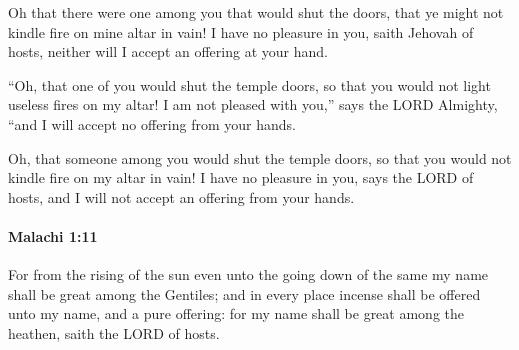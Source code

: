 			\begin{versebox}
					\item[BHS] 
					\item[LXX] 
					\item[ASV] Oh that there were one among you that would shut the doors, that ye might not kindle fire on mine altar in vain! I have no pleasure in you, saith Jehovah of hosts, neither will I accept an offering at your hand.
					\item[NIV] “Oh, that one of you would shut the temple doors, so that you would not light useless fires on my altar! I am not pleased with you,” says the LORD Almighty, “and I will accept no offering from your hands.
					\item[NRSV] Oh, that someone among you would shut the temple doors, so that you would not kindle fire on my altar in vain! I have no pleasure in you, says the LORD of hosts, and I will not accept an offering from your hands.
			\end{versebox}

		\paragraph{Malachi 1:11} %
			\label{MALACHI-1-11}

			For from the rising of the sun even unto the going down of the same my name shall be great among the Gentiles; and in every place incense shall be offered unto my name, and a pure offering: for my name shall be great among the heathen, saith the LORD of hosts.

